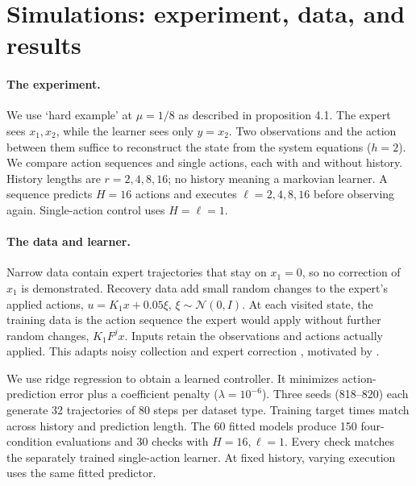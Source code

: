 \documentclass{l4dc2026}
\begin{document}


\section{Simulations: experiment, data, and results}
\paragraph{The experiment.}
We use \citet{simchowitz2025} `hard example' at $\mu=1/8$ as described in proposition 4.1. The expert sees $x_1,x_2$, while the learner sees only $y=x_2$. Two observations and the action between them suffice to reconstruct the state from the system equations ($h=2$). We compare action sequences and single actions, each with and without history. History lengths are $r=2,4,8,16$; no history meaning a markovian learner. A sequence predicts $H=16$ actions and executes $\ell=2,4,8,16$ before observing again. Single-action control uses $H=\ell=1$.

\paragraph{The data and learner.}
Narrow data contain expert trajectories that stay on $x_1=0$, so no correction of $x_1$ is demonstrated. Recovery data add small random changes to the expert's applied actions, $u=K_1x+0.05\xi$, $\xi\sim\mathcal N(0,I)$. At each visited state, the training data is the action sequence the expert would apply without further random changes, $K_1F^jx$. Inputs retain the observations and actions actually applied. This adapts noisy collection and expert correction \citep{laskey2017,ross2011}, motivated by \citet{zhang2025}.

We use ridge regression to obtain a learned controller. It minimizes action-prediction error plus a coefficient penalty ($\lambda=10^{-6}$). Three seeds (818--820) each generate 32 trajectories of 80 steps per dataset type. Training target times match across history and prediction length. The 60 fitted models produce 150 four-condition evaluations and 30 checks with $H=16,\ell=1$. Every check matches the separately trained single-action learner. At fixed history, varying execution uses the same fitted predictor.
\end{document}
